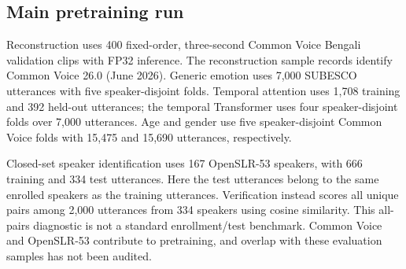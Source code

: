 \documentclass[11pt,a4paper]{article}
\begin{document}
\subsection{Main pretraining run}

Reconstruction uses 400 fixed-order, three-second Common Voice Bengali validation clips with FP32 inference. The reconstruction sample records identify Common Voice 26.0 (June 2026). Generic emotion uses 7,000 SUBESCO utterances with five speaker-disjoint folds. Temporal attention uses 1,708 training and 392 held-out utterances; the temporal Transformer uses four speaker-disjoint folds over 7,000 utterances. Age and gender use five speaker-disjoint Common Voice folds with 15,475 and 15,690 utterances, respectively.

Closed-set speaker identification uses 167 OpenSLR-53 speakers, with 666 training and 334 test utterances. Here the test utterances belong to the same enrolled speakers as the training utterances. Verification instead scores all unique pairs among 2,000 utterances from 334 speakers using cosine similarity. This all-pairs diagnostic is not a standard enrollment/test benchmark. Common Voice and OpenSLR-53 contribute to pretraining, and overlap with these evaluation samples has not been audited.
\end{document}
